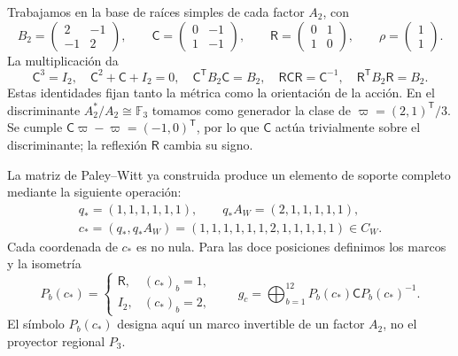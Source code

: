 Trabajamos en la base de raíces simples de cada factor \(A_2\), con
\begin{equation}
 B_2=\begin{pmatrix}2&-1\\-1&2\end{pmatrix},\qquad
 \mathsf C=\begin{pmatrix}0&-1\\1&-1\end{pmatrix},\qquad
 \mathsf R=\begin{pmatrix}0&1\\1&0\end{pmatrix},\qquad
 \rho=\begin{pmatrix}1\\1\end{pmatrix}.
 \label{x_reciprocidad:km:coxeter-reflexion}
\end{equation}
La multiplicación da
\[
 \mathsf C^3=I_2,\quad
 \mathsf C^2+\mathsf C+I_2=0,\quad
 \mathsf C^{\mathsf T}B_2\mathsf C=B_2,\quad
 \mathsf R\mathsf C\mathsf R=\mathsf C^{-1},\quad
 \mathsf R^{\mathsf T}B_2\mathsf R=B_2.
\]
Estas identidades fijan tanto la métrica como la orientación de la acción.
En el discriminante \(A_2^*/A_2\cong\mathbb F_3\) tomamos como
generador la clase de \(\varpi=(2,1)^{\mathsf T}/3\). Se cumple
\(\mathsf C\varpi-\varpi=(-1,0)^{\mathsf T}\), por lo que
\(\mathsf C\) actúa trivialmente sobre el discriminante; la reflexión
\(\mathsf R\) cambia su signo.

La matriz de Paley--Witt ya construida produce un elemento de soporte
completo mediante la siguiente operación:
\begin{equation}
 \begin{gathered}
 q_*=(1,1,1,1,1,1),\qquad q_*A_W=(2,1,1,1,1,1),\\
 c_*=(q_*,q_*A_W)
 =(1,1,1,1,1,1,2,1,1,1,1,1)\in C_W.
 \end{gathered}
 \label{x_reciprocidad:km:palabra-total}
\end{equation}
Cada coordenada de \(c_*\) es no nula. Para las doce posiciones
definimos los marcos y la isometría
\begin{equation}
 P_b(c_*)=
 \begin{cases}\mathsf R,&(c_*)_b=1,\\I_2,&(c_*)_b=2,\end{cases}
 \qquad
 g_c=\bigoplus_{b=1}^{12}P_b(c_*)\mathsf C P_b(c_*)^{-1}.
 \label{x_reciprocidad:km:isometria-ternaria}
\end{equation}
El símbolo \(P_b(c_*)\) designa aquí un marco invertible de un factor
\(A_2\), no el proyector regional \(P_3\).

